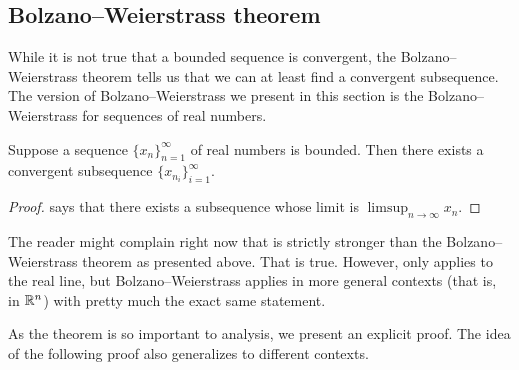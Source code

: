 \subsection{Bolzano--Weierstrass theorem}

While it is not true that a bounded sequence is convergent, the
Bolzano--Weierstrass theorem tells us that we can at least find a convergent
subsequence.
The version of Bolzano--Weierstrass 
we present in this section is the Bolzano--Weierstrass for
sequences of real numbers.

\begin{thm}\label{thm:bwseq}
Suppose a sequence $\{ x_n \}_{n=1}^\infty$ of real numbers is bounded.
Then there exists a convergent subsequence $\{ x_{n_i} \}_{i=1}^\infty$.
\end{thm}

\begin{proof}
 says that there exists
a subsequence whose limit is $\limsup_{n\to\infty} x_n$.
\end{proof}

The reader might complain right now that 
 is strictly stronger than the
Bolzano--Weierstrass theorem as presented above.  That is true.
However, 
 only applies to the real line, but
Bolzano--Weierstrass applies in more general contexts (that is, in ${\mathbb{R}}^n$)
with pretty much the exact same statement.

As the theorem is so important to analysis, we present an explicit
proof.
The idea of the following proof also generalizes to different contexts.

